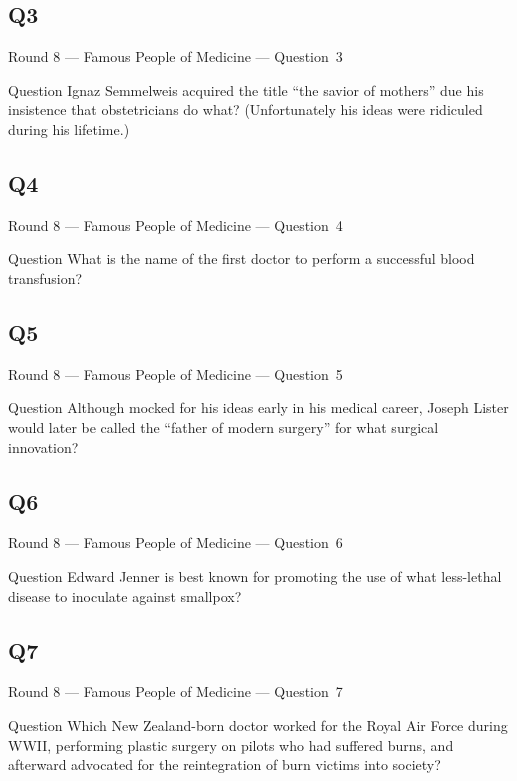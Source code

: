 \documentclass[11pt]{beamer}
\begin{document}
\subsection*{Q3}
\begin{frame}[t]{Round 8 --- Famous People of Medicine --- \mbox{Question 3}}
\vspace{-0.5em}
\begin{block}{Question}
Ignaz Semmelweis acquired the title ``the savior of mothers'' due his insistence that obstetricians do what? (Unfortunately his ideas were ridiculed during his lifetime.)
\end{block}
\end{frame}
\subsection*{Q4}
\begin{frame}[t]{Round 8 --- Famous People of Medicine --- \mbox{Question 4}}
\vspace{-0.5em}
\begin{block}{Question}
What is the name of the first doctor to perform a successful blood transfusion?
\end{block}
\end{frame}
\subsection*{Q5}
\begin{frame}[t]{Round 8 --- Famous People of Medicine --- \mbox{Question 5}}
\vspace{-0.5em}
\begin{block}{Question}
Although mocked for his ideas early in his medical career, Joseph Lister would later be called the ``father of modern surgery'' for what surgical innovation?
\end{block}
\end{frame}
\subsection*{Q6}
\begin{frame}[t]{Round 8 --- Famous People of Medicine --- \mbox{Question 6}}
\vspace{-0.5em}
\begin{block}{Question}
Edward Jenner is best known for promoting the use of what less-lethal disease to inoculate against smallpox?
\end{block}
\end{frame}
\subsection*{Q7}
\begin{frame}[t]{Round 8 --- Famous People of Medicine --- \mbox{Question 7}}
\vspace{-0.5em}
\begin{block}{Question}
Which New Zealand-born doctor worked for the Royal Air Force during WWII, performing plastic surgery on pilots who had suffered burns, and afterward advocated for the reintegration of burn victims into society?
\end{block}
\end{frame}
\end{document}

